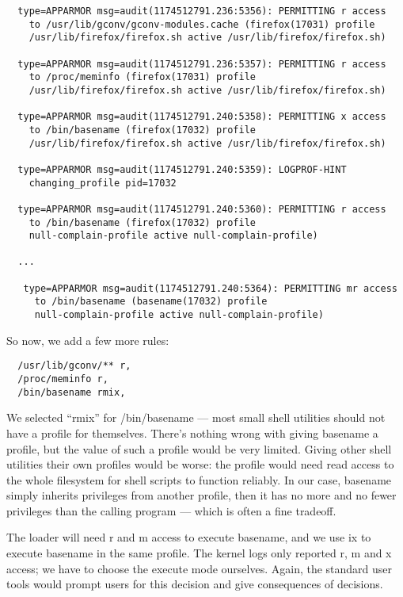 \documentclass[a4paper]{article}
\begin{document}
\begin{small}
\begin{verbatim}
  type=APPARMOR msg=audit(1174512791.236:5356): PERMITTING r access
    to /usr/lib/gconv/gconv-modules.cache (firefox(17031) profile
    /usr/lib/firefox/firefox.sh active /usr/lib/firefox/firefox.sh)

  type=APPARMOR msg=audit(1174512791.236:5357): PERMITTING r access
    to /proc/meminfo (firefox(17031) profile
    /usr/lib/firefox/firefox.sh active /usr/lib/firefox/firefox.sh)

  type=APPARMOR msg=audit(1174512791.240:5358): PERMITTING x access
    to /bin/basename (firefox(17032) profile
    /usr/lib/firefox/firefox.sh active /usr/lib/firefox/firefox.sh)

  type=APPARMOR msg=audit(1174512791.240:5359): LOGPROF-HINT
    changing_profile pid=17032

  type=APPARMOR msg=audit(1174512791.240:5360): PERMITTING r access
    to /bin/basename (firefox(17032) profile
    null-complain-profile active null-complain-profile)

  ...

   type=APPARMOR msg=audit(1174512791.240:5364): PERMITTING mr access
     to /bin/basename (basename(17032) profile
     null-complain-profile active null-complain-profile)
\end{verbatim}
\end{small}


So now, we add a few more rules:

\begin{small}
\begin{verbatim}
  /usr/lib/gconv/** r,
  /proc/meminfo r,
  /bin/basename rmix,
\end{verbatim}
\end{small}

We selected ``rmix'' for /bin/basename --- most small shell utilities
should not have a profile for themselves.  There's nothing wrong with
giving basename a profile, but the value of such a profile would be very
limited. Giving other shell utilities their own profiles would be worse:
the profile would need read access to the whole filesystem for shell
scripts to function reliably. In our case, basename simply inherits
privileges from another profile, then it has no more and no fewer
privileges than the calling program --- which is often a fine tradeoff.

The loader will need r and m access to execute basename, and we use ix
to execute basename in the same profile. The kernel logs only reported
r, m and x access; we have to choose the execute mode ourselves.  Again,
the standard user tools would prompt users for this decision and give
consequences of decisions.
\end{document}
